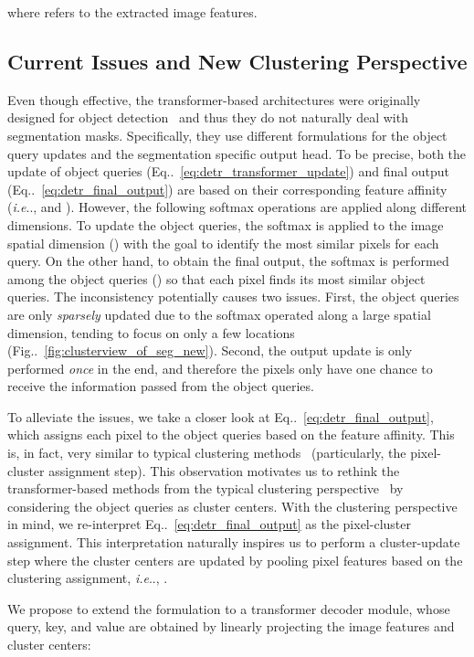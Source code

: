 \documentclass[10pt,twocolumn,letterpaper]{article}
\makeatletter
\DeclareRobustCommand\onedot{\futurelet\@let@token\@onedot}
\def\@onedot{\ifx\@let@token.\else.\null\fi\xspace}
\def\ie{\emph{i.e}\onedot} \def\Ie{\emph{I.e}\onedot}
\newcommand{\figref}[1]{Fig\onedot~\ref{#1}}
\newcommand{\equref}[1]{Eq\onedot~\eqref{#1}}
\makeatother
\begin{document}
where  refers to the extracted image features.


\subsection{Current Issues and New Clustering Perspective}
\label{sec:issues_and_clustering}
Even though effective, the transformer-based architectures were originally designed for object detection~\cite{carion2020end} and thus they do not naturally deal with segmentation masks. Specifically, they use different formulations for the object query updates and the segmentation specific output head. To be precise, both the update of object queries (\equref{eq:detr_transformer_update}) and final output (\equref{eq:detr_final_output}) are based on their corresponding feature affinity (\ie,  and ). However, the following softmax operations are applied along different dimensions. To update the object queries, the softmax is applied to the image spatial dimension () with the goal to identify the most similar pixels for each query. On the other hand, to obtain the final output, the softmax is performed among the object queries () so that each pixel finds its most similar object queries. The inconsistency potentially causes two issues. First, the object queries are only {\it sparsely} updated due to the softmax operated along a large spatial dimension, tending to focus on only a few locations (\figref{fig:clusterview_of_seg_new}). Second, the output update is only performed {\it once} in the end, and therefore the pixels only have one chance to receive the information passed from the object queries.

To alleviate the issues, we take a closer look at \equref{eq:detr_final_output}, which assigns each pixel to the object queries based on the feature affinity. This is, in fact, very similar to typical clustering methods~\cite{lloyd1982least,achanta2012slic} (particularly, the pixel-cluster assignment step). This observation motivates us to rethink the transformer-based methods from the typical clustering perspective~\cite{zhu1996region,achanta2012slic} by considering the object queries  as cluster centers. With the clustering perspective in mind, we re-interpret \equref{eq:detr_final_output} as the pixel-cluster assignment. This interpretation naturally inspires us to perform a cluster-update step where the cluster centers are updated by pooling pixel features based on the clustering assignment, \ie, .


We propose to extend the formulation to a transformer decoder module, whose query, key, and value are obtained by linearly projecting the image features and cluster centers:
\end{document}
